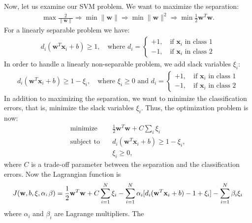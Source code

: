 \begin{enumerate}
\begin{solution}
    Now, let us examine our SVM problem.  We want to maximize the
    separation:
    \begin{align*}
      \max \frac{2}{\|\mathbf{w}\|} \Rightarrow \min \|\mathbf{w}\|
      \Rightarrow \min \|\mathbf{w}\|^2 \Rightarrow \min
      \frac{1}{2} \mathbf{w}^T\mathbf{w}.
    \end{align*}
    For a linearly separable problem we have:
    \begin{align*}
      d_i(\mathbf{w}^T\mathbf{x}_i + b) \geq 1, \quad \text{where }
      d_i =
      \begin{cases}
        +1, \quad \text{if } \mathbf{x}_i \text{ in class 1}
        \\
        -1, \quad \text{if } \mathbf{x}_i \text{ in class 2}
      \end{cases}
    \end{align*}
    In order to handle a linearly non-separable problem, we add slack
    variables $\xi_i$:
    \begin{align*}
      d_i(\mathbf{w}^T\mathbf{x}_i + b) \geq 1 - \xi_i, \quad
      \text{where } \xi_i \geq 0 \text{ and } d_i =
      \begin{cases}
        +1, \quad \text{if } \mathbf{x}_i \text{ in class 1}
        \\
        -1, \quad \text{if } \mathbf{x}_i \text{ in class 2}
      \end{cases}
    \end{align*}
    In addition to maximizing the separation, we want to minimize the
    classification errors, that is, minimize the slack variables
    $\xi_i$.  Thus, the optimization problem is now:
    \begin{align*}
      \text{minimize} &\quad \frac{1}{2} \mathbf{w}^T\mathbf{w} + C
      \sum_i \xi_i
      \\
      \text{subject to} &\quad d_i(\mathbf{w}^T\mathbf{x}_i + b) \geq
      1 - \xi_i,
      \\
      &\quad
      \xi_i \geq 0,
    \end{align*}
    where $C$ is a trade-off parameter between the separation and the
    classification errors.  Now the Lagrangian function is
    \begin{align*}
      J(\mathbf{w}, b, \xi, \alpha, \beta) = \frac{1}{2}\mathbf{w}^T\mathbf{w} + C
      \sum_{i=1}^N \xi_i - \sum_{i=1}^N \alpha_i[d_i(\mathbf{w}^T \mathbf{x}_i + b) -
      1 + \xi_i] - \sum_{i=1}^N \beta_i \xi_i
    \end{align*}
    where $\alpha_i$ and $\beta_i$ are Lagrange multipliers.  The

\end{solution}
\end{enumerate}
